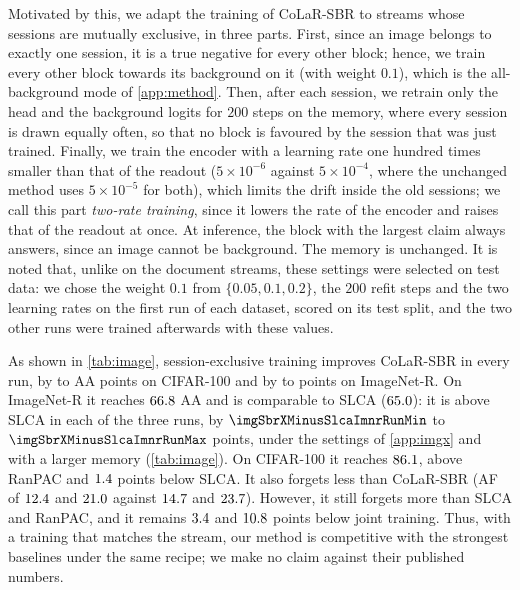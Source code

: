  Motivated by this, we adapt the training of CoLaR-SBR to streams whose sessions are mutually exclusive, in three parts. First, since an image belongs to exactly one session, it is a true negative for every other block; hence, we train every other block towards its background on it (with weight $0.1$), which is the all-background mode of \cref{app:method}. Then, after each session, we retrain only the head and the background logits for $200$ steps on the memory, where every session is drawn equally often, so that no block is favoured by the session that was just trained. Finally, we train the encoder with a learning rate one hundred times smaller than that of the readout ($5{\times}10^{-6}$ against $5{\times}10^{-4}$, where the unchanged method uses $5{\times}10^{-5}$ for both), which limits the drift inside the old sessions; we call this part \emph{two-rate training}, since it lowers the rate of the encoder and raises that of the readout at once. At inference, the block with the largest claim always answers, since an image cannot be background. The memory is unchanged. It is noted that, unlike on the document streams, these settings were selected on test data: we chose the weight $0.1$ from $\{0.05, 0.1, 0.2\}$, the $200$ refit steps and the two learning rates on the first run of each dataset, scored on its test split, and the two other runs were trained afterwards with these values.

 As shown in \cref{tab:image}, session-exclusive training improves CoLaR-SBR in every run, by \imgSbrXMinusSbrCifarMin{} to \imgSbrXMinusSbrCifarMax{} AA points on CIFAR-100 and by \imgSbrXMinusSbrImnrMin{} to \imgSbrXMinusSbrImnrMax{} points on ImageNet-R. On ImageNet-R it reaches $66.8$ AA and is comparable to SLCA ($65.0$): it is above SLCA in each of the three runs, by $\imgSbrXMinusSlcaImnrRunMin$ to $\imgSbrXMinusSlcaImnrRunMax$ points, under the settings of \cref{app:imgx} and with a larger memory (\cref{tab:image}). On CIFAR-100 it reaches $86.1$, above RanPAC and $1.4$ points below SLCA. It also forgets less than CoLaR-SBR (AF of $12.4$ and $21.0$ against $14.7$ and $23.7$). However, it still forgets more than SLCA and RanPAC, and it remains $3.4$ and $10.8$ points below joint training. Thus, with a training that matches the stream, our method is competitive with the strongest baselines under the same recipe; we make no claim against their published numbers.

